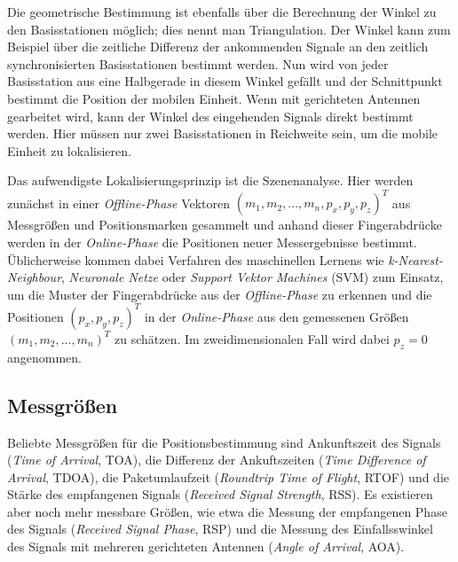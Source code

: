 Die geometrische Bestimmung ist ebenfalls über die Berechnung der Winkel zu den Basisstationen möglich; dies nennt man Triangulation. Der Winkel kann zum Beispiel über die zeitliche Differenz der ankommenden Signale an den zeitlich synchronisierten Basisstationen bestimmt werden. 
Nun wird von jeder Basisstation aus eine Halbgerade in diesem Winkel gefällt und der Schnittpunkt bestimmt die Position der mobilen Einheit. 
Wenn mit gerichteten Antennen gearbeitet wird, kann der Winkel des eingehenden Signals direkt bestimmt werden.
Hier müssen nur zwei Basisstationen in Reichweite sein, um die mobile Einheit zu lokalisieren. 

Das aufwendigste Lokalisierungsprinzip ist die Szenenanalyse. Hier werden zunächst in einer \emph{Offline-Phase} Vektoren $(m_1,m_2,...,m_n,p_x,p_y,p_z)^T$ aus Messgrößen und Positionsmarken gesammelt und anhand dieser Fingerabdrücke werden in der \emph{Online-Phase} die Positionen neuer Messergebnisse bestimmt. Üblicherweise kommen dabei Verfahren des maschinellen Lernens wie \emph{k-Nearest-Neighbour}, \emph{Neuronale Netze} oder \emph{Support Vektor Machines} (SVM) zum Einsatz, um die Muster der Fingerabdrücke aus der \emph{Offline-Phase} zu erkennen und die Positionen $(p_x,p_y,p_z)^T$ in der \emph{Online-Phase} aus den gemessenen Größen $(m_1,m_2,...,m_n)^T$ zu schätzen. Im zweidimensionalen Fall wird dabei $p_z = 0$ angenommen.

\subsection{Messgrößen}
Beliebte Messgrößen für die Positionsbestimmung sind Ankunftszeit des Signals (\emph{Time of Arrival}, TOA), die Differenz der Ankuftszeiten (\emph{Time Difference of Arrival}, TDOA), die Paketumlaufzeit (\emph{Roundtrip Time of Flight}, RTOF) und die Stärke des empfangenen Signals (\emph{Received Signal Strength}, RSS). Es existieren aber noch mehr messbare Größen, wie etwa die Messung der empfangenen Phase des Signals (\emph{Received Signal Phase}, RSP) und die Messung des Einfallsswinkel des Signals mit mehreren gerichteten Antennen (\emph{Angle of Arrival}, AOA). 

